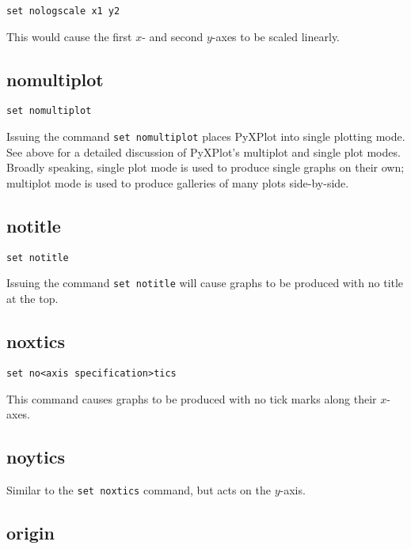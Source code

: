 \begin{verbatim}
set nologscale x1 y2
\end{verbatim}

This would cause the first $x$- and second $y$-axes to be scaled linearly.


\subsection{nomultiplot}

\begin{verbatim}
set nomultiplot
\end{verbatim}

Issuing the command {\tt set nomultiplot} places PyXPlot into single plotting
mode.  See above for a detailed discussion of PyXPlot's multiplot and
single plot modes. Broadly speaking, single plot mode is used to produce single
graphs on their own; multiplot mode is used to produce galleries of many plots
side-by-side.


\subsection{notitle}

\begin{verbatim}
set notitle
\end{verbatim}

Issuing the command {\tt set notitle} will cause graphs to be produced with no
title at the top.


\subsection{noxtics}

\begin{verbatim}
set no<axis specification>tics
\end{verbatim}

This command causes graphs to be produced with no tick marks along their $x$-axes.

\subsection{noytics}

Similar to the {\tt set noxtics} command, but acts on the $y$-axis.


\subsection{origin}


